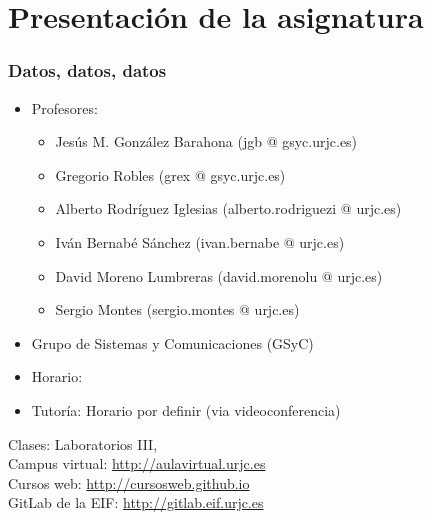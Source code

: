 
\section{Presentación de la asignatura}


\begin{frame}
\frametitle{Datos, datos, datos}

\begin{itemize}
\item Profesores:
  \begin{itemize}
  \item Jesús M. González Barahona (jgb @ gsyc.urjc.es)
  \item Gregorio Robles (grex @ gsyc.urjc.es)
  \item Alberto Rodríguez Iglesias (alberto.rodriguezi @ urjc.es)
  \item Iván Bernabé Sánchez (ivan.bernabe @ urjc.es)
  \item David Moreno Lumbreras (david.morenolu @ urjc.es)
  \item Sergio Montes (sergio.montes @ urjc.es)
  \end{itemize}
\item Grupo de Sistemas y Comunicaciones (GSyC)
\item Horario: \horario
\item Tutoría: Horario por definir (via videoconferencia)
\end{itemize}

\begin{flushright}
  Clases: Laboratorios III, \labo \\
  Campus virtual: {\small \url{http://aulavirtual.urjc.es}} \\
  Cursos web: {\small \url{http://cursosweb.github.io}} \\
  GitLab de la EIF: {\small \url{http://gitlab.eif.urjc.es}} \\
\end{flushright}

\end{frame}


